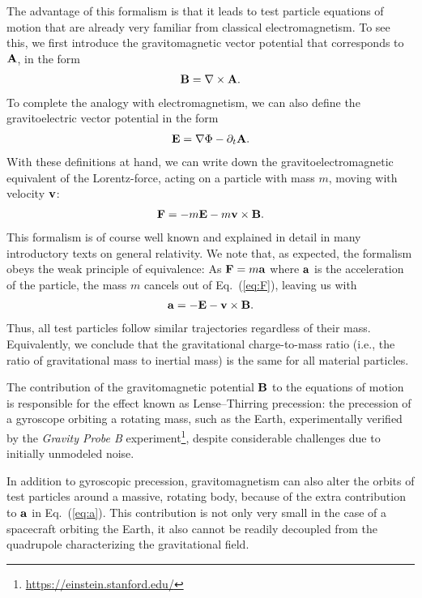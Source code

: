 \documentclass{ws-ijmpd}
\begin{document}
The advantage of this formalism is that it leads to test particle equations of motion that are already very familiar from classical electromagnetism. To see this, we first introduce the gravitomagnetic vector potential that corresponds to ${\bf A}$, in the form
\begin{align}
{\bf B}=\nabla\times {\bf A}.\label{eq:B}
\end{align}
To complete the analogy with electromagnetism, we can also define the gravitoelectric vector potential in the form
\begin{align}
{\bf E}=\nabla\Phi-\partial_t{\bf A}.
\end{align}
With these definitions at hand, we can write down the gravitoelectromagnetic equivalent of the Lorentz-force, acting on a particle with mass $m$, moving with velocity ${\bf v}$:
\begin{align}
{\bf F}=-m{\bf E}-m{\bf v}\times{\bf B}.\label{eq:F}
\end{align}
This formalism is of course well known and explained in detail in many introductory texts on general relativity. We note that, as expected, the formalism obeys the weak principle of equivalence: As ${\bf F}=m{\bf a}$ where ${\bf a}$ is the acceleration of the particle, the mass $m$ cancels out of Eq.~(\ref{eq:F}), leaving us with
\begin{align}
{\bf a}=-{\bf E}-{\bf v}\times {\bf B}.\label{eq:a}
\end{align}
Thus, all test particles follow similar trajectories regardless of their mass. Equivalently, we conclude that the gravitational charge-to-mass ratio (i.e., the ratio of gravitational mass to inertial mass) is the same for all material particles.

The contribution of the gravitomagnetic potential ${\bf B}$ to the equations of motion is responsible for the effect known as Lense--Thirring precession\cite{LenseThirring1918,Mashhoon1984}: the precession of a gyroscope orbiting a rotating mass, such as the Earth, experimentally verified by the {\em Gravity Probe B} experiment\footnote{\url{https://einstein.stanford.edu/}}, despite considerable challenges due to initially unmodeled noise.

In addition to gyroscopic precession, gravitomagnetism can also alter the orbits of test particles around a massive, rotating body, because of the extra contribution to ${\bf a}$ in Eq.~(\ref{eq:a}). This contribution is not only very small in the case of a spacecraft orbiting the Earth, it also cannot be readily decoupled from the quadrupole characterizing the gravitational field\cite{AsadaKasai2000}.
\end{document}
